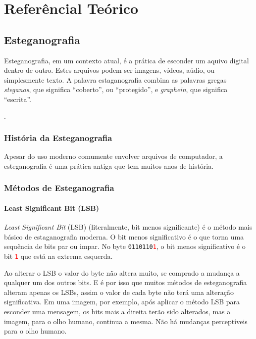 \chapter{Referêncial Teórico}

\section{Esteganografia}

Esteganografia, em um contexto atual, é a prática de esconder um aquivo digital dentro de outro. Estes arquivos podem ser imagens, vídeos, aúdio, ou simplesmente texto. A palavra estaganografia combina as palavras gregas \emph{steganos}, que significa ``coberto'', ou ``protegido'', e \emph{graphein}, que significa ``escrita''.

.


\subsection{História da Esteganografia}
Apesar do uso moderno comumente envolver arquivos de computador, a esteganografia é uma prática antiga que tem muitos anos de história.

\subsection{Métodos de Esteganografia}
\subsubsection{Least Significant Bit (LSB)}

\emph{Least Significant Bit} (LSB) (literalmente, bit menos significante) é o método mais básico de estaganografia moderna. O bit menos significativo é o que torna uma sequência de bits par ou impar. No byte \texttt{0110110\textcolor{red}{1}}, o bit menos significativo é o bit \texttt{\textcolor{red}{1}} que está na extrema esquerda.

Ao alterar o LSB o valor do byte não altera muito, se comprado a mudança a qualquer um dos outros bits. E é por isso que muitos métodos de esteganografia alteram apenas os LSBs, assim o valor de cada byte não terá uma alteração significativa. Em uma imagem, por exemplo, após aplicar o método LSB para esconder uma mensagem, os bits mais a direita terão sido alterados, mas a imagem, para o olho humano, continua a mesma. Não há mudanças perceptíveis para o olho humano.

